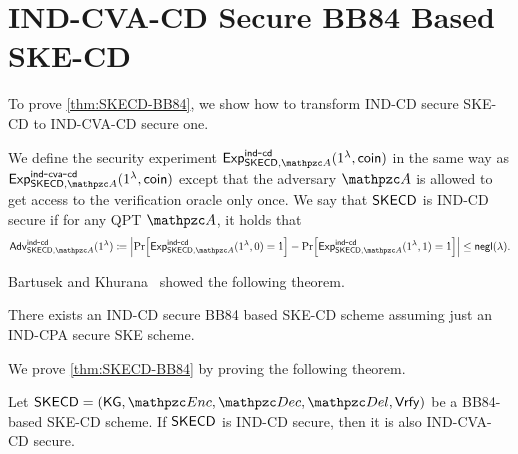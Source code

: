 
\newcommand{\xbar}{\bar{x}}
\newcommand{\thetabar}{\bar{\theta}}
\newcommand{\FV}{\mathtt{FV}}
\newcommand{\cla}{\mathsf{cla}}

\section{IND-CVA-CD Secure BB84 Based SKE-CD}\label{sec:SKECD-BB84}

To prove \cref{thm:SKECD-BB84}, we show how to transform IND-CD secure SKE-CD to IND-CVA-CD secure one.

\begin{definition}\label{def-ind-cd}
We define the security experiment $\expb{\CDSKE,\qA}{ind}{cd}(1^\secp,\coin)$ in the same way as $\expc{\CDSKE,\qA}{ind}{cva}{cd}(1^\secp,\coin)$ except that the adversary $\qA$ is allowed to get access to the verification oracle only once.
We say that $\mathsf{SKECD}$ is IND-CD secure if for any QPT $\qA$, it holds that
\begin{align}
\advb{\CDSKE,\qA}{ind}{cd}(1^\secp)\seteq \abs{\Pr[
\expb{\CDSKE,\qA}{ind}{cd}(1^\secp, 0)=1] - \Pr[
\expb{\CDSKE,\qA}{ind}{cd}(1^\secp, 1)=1] }\le \negl(\secp).
\end{align}
\end{definition}

Bartusek and Khurana~\cite{C:BarKhu23} showed the following theorem.

\begin{theorem}
There exists an IND-CD secure BB84 based SKE-CD scheme assuming just an IND-CPA secure SKE scheme.
\end{theorem}

We prove \cref{thm:SKECD-BB84} by proving the following theorem.

\begin{theorem}
Let $\CDSKE=(\KG,\qEnc,\qDec,\qDel,\Vrfy)$ be a BB84-based SKE-CD scheme.
If $\mathsf{SKECD}$ is IND-CD secure, then it is also IND-CVA-CD secure.
\end{theorem}

